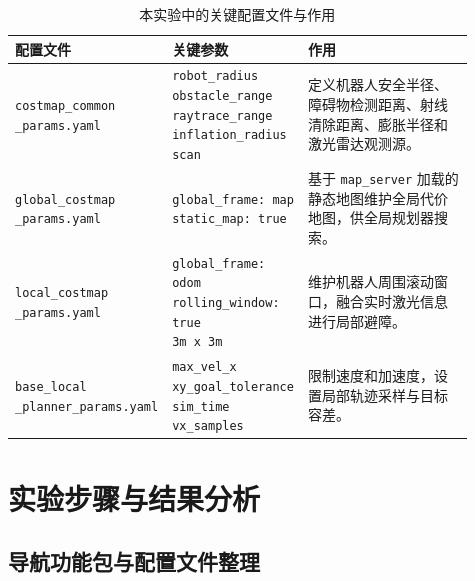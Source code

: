 \documentclass[11pt,a4paper,fontset=fandol]{ctexart}
\begin{document}
\begin{table}[H]
  \small
  \setlength{\tabcolsep}{3pt}
  \centering
  \caption{本实验中的关键配置文件与作用}
  \begin{tabular}{p{0.23\linewidth}p{0.27\linewidth}p{0.41\linewidth}}
    \toprule
    配置文件 & 关键参数 & 作用 \\
    \midrule
    \makecell[l]{\texttt{costmap\_common}\\\texttt{\_params.yaml}} & \makecell[l]{\texttt{robot\_radius}\\\texttt{obstacle\_range}\\\texttt{raytrace\_range}\\\texttt{inflation\_radius}\\\texttt{scan}} & 定义机器人安全半径、障碍物检测距离、射线清除距离、膨胀半径和激光雷达观测源。 \\
    \makecell[l]{\texttt{global\_costmap}\\\texttt{\_params.yaml}} & \makecell[l]{\texttt{global\_frame: map}\\\texttt{static\_map: true}} & 基于 \verb|map_server| 加载的静态地图维护全局代价地图，供全局规划器搜索。 \\
    \makecell[l]{\texttt{local\_costmap}\\\texttt{\_params.yaml}} & \makecell[l]{\texttt{global\_frame: odom}\\\texttt{rolling\_window: true}\\\texttt{3m x 3m}} & 维护机器人周围滚动窗口，融合实时激光信息进行局部避障。 \\
    \makecell[l]{\texttt{base\_local}\\\texttt{\_planner\_params.yaml}} & \makecell[l]{\texttt{max\_vel\_x}\\\texttt{xy\_goal\_tolerance}\\\texttt{sim\_time}\\\texttt{vx\_samples}} & 限制速度和加速度，设置局部轨迹采样与目标容差。 \\
    \bottomrule
  \end{tabular}
  \label{tab:configs}
\end{table}

\section{实验步骤与结果分析}

\subsection{导航功能包与配置文件整理}
\end{document}
